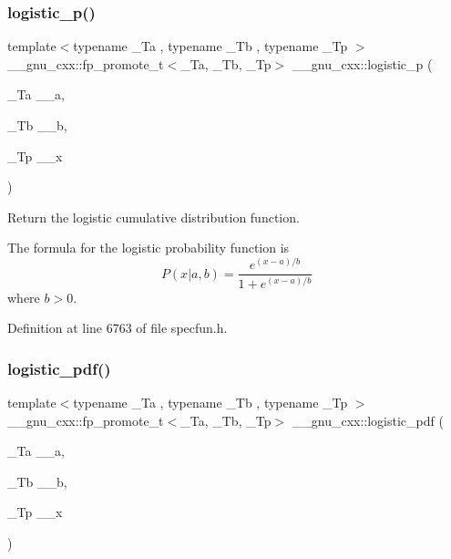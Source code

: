 \subsubsection{\texorpdfstring{logistic\+\_\+p()}{logistic\_p()}}
{\footnotesize\ttfamily template$<$typename \+\_\+\+Ta , typename \+\_\+\+Tb , typename \+\_\+\+Tp $>$ \\
\+\_\+\+\_\+gnu\+\_\+cxx\+::fp\+\_\+promote\+\_\+t$<$\+\_\+\+Ta, \+\_\+\+Tb, \+\_\+\+Tp$>$ \+\_\+\+\_\+gnu\+\_\+cxx\+::logistic\+\_\+p (\begin{DoxyParamCaption}\item[{\+\_\+\+Ta}]{\+\_\+\+\_\+a,  }\item[{\+\_\+\+Tb}]{\+\_\+\+\_\+b,  }\item[{\+\_\+\+Tp}]{\+\_\+\+\_\+x }\end{DoxyParamCaption})\hspace{0.3cm}{\ttfamily [inline]}}



Return the logistic cumulative distribution function. 

The formula for the logistic probability function is \[ P(x| a, b) = \frac{e^{(x - a)/b}}{1 + e^{(x - a)/b}} \] where $b > 0$. 

Definition at line 6763 of file specfun.\+h.

\mbox{\label{group__gnu__math__spec__func_gaeb3e768c11c8cd11804827a09f19b1e3}} 
\subsubsection{\texorpdfstring{logistic\+\_\+pdf()}{logistic\_pdf()}}
{\footnotesize\ttfamily template$<$typename \+\_\+\+Ta , typename \+\_\+\+Tb , typename \+\_\+\+Tp $>$ \\
\+\_\+\+\_\+gnu\+\_\+cxx\+::fp\+\_\+promote\+\_\+t$<$\+\_\+\+Ta, \+\_\+\+Tb, \+\_\+\+Tp$>$ \+\_\+\+\_\+gnu\+\_\+cxx\+::logistic\+\_\+pdf (\begin{DoxyParamCaption}\item[{\+\_\+\+Ta}]{\+\_\+\+\_\+a,  }\item[{\+\_\+\+Tb}]{\+\_\+\+\_\+b,  }\item[{\+\_\+\+Tp}]{\+\_\+\+\_\+x }\end{DoxyParamCaption})\hspace{0.3cm}{\ttfamily [inline]}}



